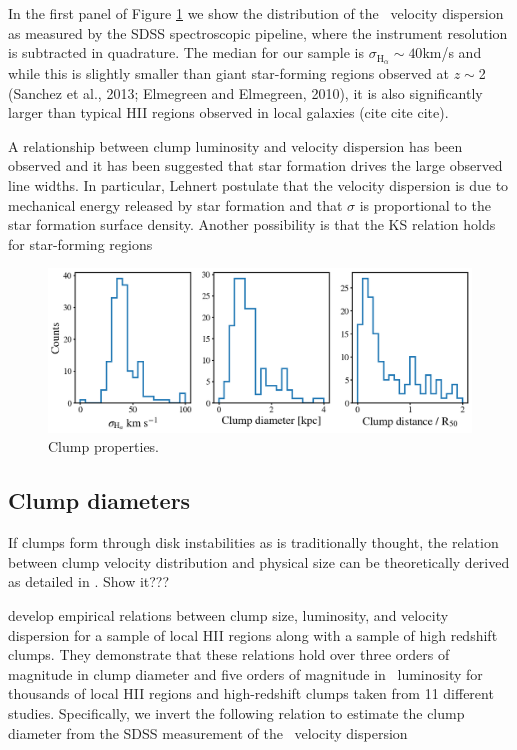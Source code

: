 In the first panel of Figure \ref{fig: clump properties} we show the distribution of the \ha~velocity dispersion as measured by the SDSS spectroscopic pipeline, where the instrument resolution is subtracted in quadrature. The median for our sample is $\sigma_{\mathrm{H}_{\alpha}}\sim40$km/s and while this is slightly smaller than giant star-forming regions observed at $z\sim$2 (Sanchez et al., 2013; Elmegreen and Elmegreen, 2010), it is also significantly larger than typical HII regions observed in local galaxies (cite cite cite).

A relationship between clump luminosity and velocity dispersion has been observed and it has been suggested that star formation drives the large observed line widths. In particular, Lehnert postulate that the velocity dispersion is due to mechanical energy released by star formation and that $\sigma$ is proportional to the star formation surface density. Another possibility is that the KS relation holds for star-forming regions


\begin{figure}
\includegraphics[width=\textwidth]{Figures/clump_properties.png}
\caption[Properties of ``clumps'': velocity dispersion, clump diameter, and clump galactic radial distance.]{Clump properties. }
\label{fig: clump properties}
\end{figure}



\subsection{Clump diameters}
If clumps form through disk instabilities as is traditionally thought, the relation between clump velocity distribution and physical size can be theoretically derived as detailed in \citep[e.g.,][]{Wisnioski2012}. Show it???

\cite{Wisnioski2012} develop empirical relations between clump size, luminosity, and velocity dispersion for a sample of local HII regions along with a sample of high redshift clumps. They demonstrate that these relations hold over three orders of magnitude in clump diameter and five orders of magnitude in \ha~luminosity for thousands of local HII regions and high-redshift clumps taken from 11 different studies. Specifically, we invert the following relation to estimate the clump diameter from the SDSS measurement of the \ha~velocity dispersion

